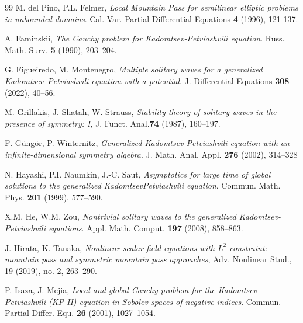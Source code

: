 \documentclass[11pt]{amsart}
\numberwithin{equation}{section}
\begin{document}
{{{\begin{thebibliography}{99}
 M. del Pino, P.L. Felmer, \emph{Local Mountain Pass for semilinear elliptic problems in unbounded domains}. Cal. Var. Partial Differential Equations  \textbf{4} (1996), 121-137.

 A. Faminskii, \emph{The Cauchy problem for Kadomtsev-Petviashvili equation}. Russ. Math. Surv. \textbf{5} (1990), 203--204.



 G. Figueiredo, M. Montenegro, \emph{Multiple solitary waves for a generalized Kadomtsev--Petviashvili equation with a potential}. J. Differential Equations \textbf{308} (2022), 40--56.





M. Grillakis, J. Shatah, W. Strauss, \emph{Stability theory of solitary waves in the presence of symmetry: I}, J. Funct. Anal.\textbf{74} (1987), 160--197.


 F. G\"{u}ng\"{o}r, P. Winternitz, \emph{Generalized Kadomtsev-Petviashvili equation with an infinite-dimensional symmetry
algebra}. J. Math. Anal. Appl. \textbf{276} (2002), 314--328




 N. Hayashi, P.I. Naumkin, J.-C. Saut, \emph{Asymptotics for large time of global solutions to the generalized KadomtsevPetviashvili equation}. Commun. Math. Phys.  \textbf{201} (1999), 577--590.

 X.M. He, W.M. Zou,  \emph{Nontrivial solitary waves to the generalized Kadomtsev-Petviashvili equations}.  Appl. Math. Comput. \textbf{197} (2008), 858--863.


 J. Hirata, K. Tanaka, {\it Nonlinear scalar field equations with $L^2$ constraint: mountain pass and symmetric mountain pass approaches}, Adv. Nonlinear Stud., 19 (2019), no. 2, 263--290.



 P. Isaza, J. Mejia,  \emph{Local and global Cauchy problem for the Kadomtsev-Petviashvili (KP-II) equation in Sobolev spaces of negative indices}. Commun. Partial Differ. Equ. \textbf{26} (2001), 1027--1054.


\end{thebibliography}}}}
\end{document}
